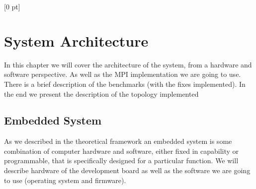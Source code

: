 \titlespacing{\chapter}{0 pt}{30 pt}{50 pt}[0 pt]
\titleformat{\section}{\Large\bfseries}{\thesection}{0 pt}{\hspace{30 pt}}
\titleformat{\subsection}{\large\bfseries}{\thesubsection}{0 pt}{\hspace{30 pt}}
\pagestyle{fancy}
\fancyhead[LO,LE]{\footnotesize\emph{\leftmark}}
\fancyhead[RO,RE]{\thepage}
\fancyfoot[CO,CE]{}

\chapter{System Architecture}

\normalsize
\noindent
In this chapter we will cover the architecture of the system, from a hardware
and software perspective. As well as the MPI implementation we are going to
use. There is a brief description of the benchmarks (with the fixes
implemented). In the end we present the description of the topology implemented

\section{Embedded System}
\noindent

As we described in the theoretical framework an embedded system is some
combination of computer hardware and software, either fixed in capability or
programmable, that is specifically designed for a particular function. We will
describe hardware of the development board as well as the software we are going
to use (operating system and firmware).

